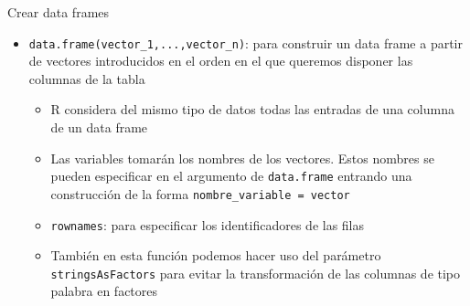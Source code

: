 \documentclass[
  ignorenonframetext,
  aspectratio=169]{beamer}
\newenvironment{Shaded}{\begin{snugshade}}{\end{snugshade}}
\newcommand{\AttributeTok}[1]{\textcolor[rgb]{0.77,0.63,0.00}{#1}}
\newcommand{\ConstantTok}[1]{\textcolor[rgb]{0.00,0.00,0.00}{#1}}
\newcommand{\FunctionTok}[1]{\textcolor[rgb]{0.00,0.00,0.00}{#1}}
\newcommand{\NormalTok}[1]{#1}
\newcommand{\OtherTok}[1]{\textcolor[rgb]{0.56,0.35,0.01}{#1}}
\newcommand{\StringTok}[1]{\textcolor[rgb]{0.31,0.60,0.02}{#1}}
\providecommand{\tightlist}{%
  \setlength{\itemsep}{0pt}\setlength{\parskip}{0pt}}
\let\oldverbatim\verbatim
\let\endoldverbatim\endverbatim
\renewenvironment{verbatim}{\tiny\oldverbatim}{\endoldverbatim}
\begin{document}

\begin{frame}[fragile]{Crear data frames}
\protect\hypertarget{crear-data-frames}{}
\begin{itemize}
\tightlist
\item
  \texttt{data.frame(vector\_1,...,vector\_n)}: para construir un data
  frame a partir de vectores introducidos en el orden en el que queremos
  disponer las columnas de la tabla

  \begin{itemize}
  \tightlist
  \item
    R considera del mismo tipo de datos todas las entradas de una
    columna de un data frame
  \item
    Las variables tomarán los nombres de los vectores. Estos nombres se
    pueden especificar en el argumento de \texttt{data.frame} entrando
    una construcción de la forma \texttt{nombre\_variable\ =\ vector}
  \item
    \texttt{rownames}: para especificar los identificadores de las filas
  \item
    También en esta función podemos hacer uso del parámetro
    \texttt{stringsAsFactors} para evitar la transformación de las
    columnas de tipo palabra en factores
  \end{itemize}
\end{itemize}
\end{frame}
\end{document}
